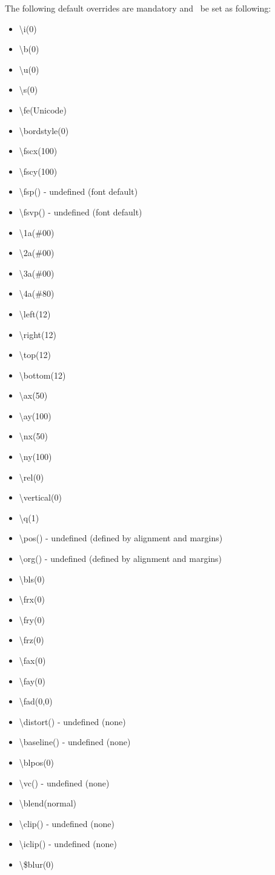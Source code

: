 \documentclass{spec}
\begin{document}
The following default overrides are mandatory and \must\ be set as following:
\begin{itemize}
\item \textbackslash i(0)
\item \textbackslash b(0)
\item \textbackslash u(0)
\item \textbackslash s(0)
\item \textbackslash fe(Unicode)
\item \textbackslash bordstyle(0)
\item \textbackslash fscx(100)
\item \textbackslash fscy(100)
\item \textbackslash fsp() - undefined (font default)
\item \textbackslash fsvp() - undefined (font default)
\item \textbackslash 1a(\#00)
\item \textbackslash 2a(\#00)
\item \textbackslash 3a(\#00)
\item \textbackslash 4a(\#80)
\item \textbackslash left(12)
\item \textbackslash right(12)
\item \textbackslash top(12)
\item \textbackslash bottom(12)
\item \textbackslash ax(50)
\item \textbackslash ay(100)
\item \textbackslash nx(50)
\item \textbackslash ny(100)
\item \textbackslash rel(0)
\item \textbackslash vertical(0)
\item \textbackslash q(1)
\item \textbackslash pos() - undefined (defined by alignment and margins)
\item \textbackslash org() - undefined (defined by alignment and margins)
\item \textbackslash bls(0)
\item \textbackslash frx(0)
\item \textbackslash fry(0)
\item \textbackslash frz(0)
\item \textbackslash fax(0)
\item \textbackslash fay(0)
\item \textbackslash fad(0,0)
\item \textbackslash distort() - undefined (none)
\item \textbackslash baseline() - undefined (none)
\item \textbackslash blpos(0)
\item \textbackslash vc() - undefined (none)
\item \textbackslash blend(normal)
\item \textbackslash clip() - undefined (none)
\item \textbackslash iclip() - undefined (none)
\item \textbackslash \$blur(0)
\end{itemize}
\end{document}
